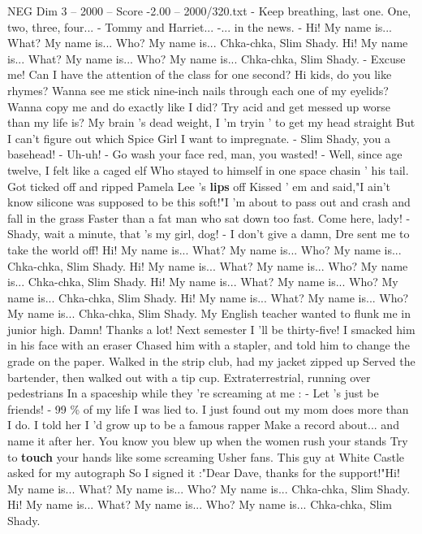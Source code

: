 \begin{textsample}{NEG Dim 3 – 2000 – Score -2.00 – 2000/320.txt}  \label{ex:f3_neg_007}
- Keep breathing, last one.
One, two, three, four... - Tommy and Harriet... -... in the news. - Hi!
My name is...
What?
My name is...
Who?
My name is...
Chka-chka, Slim Shady.
Hi!
My name is...
What?
My name is...
Who?
My name is...
Chka-chka, Slim Shady. - Excuse me!
Can I have the attention of the class for one second?
Hi kids, do you like rhymes?
Wanna see me stick nine-inch nails through each one of my eyelids?
Wanna copy me and do exactly like I did?
Try acid and get messed up worse than my life is?
My brain 's dead weight, I 'm tryin ' to get my head straight But I can't figure out which Spice Girl I want to impregnate. - Slim Shady, you a basehead! - Uh-uh! - Go wash your face red, man, you wasted! - Well, since age twelve, I felt like a caged elf Who stayed to himself in one space chasin ' his tail.
Got ticked off and ripped Pamela Lee 's \textbf{lips} off Kissed ' em and said,"I ain't know silicone was supposed to be this soft!"I 'm about to pass out and crash and fall in the grass Faster than a fat man who sat down too fast.
Come here, lady! - Shady, wait a minute, that 's my girl, dog! - I don't give a damn, Dre sent me to take the world off!
Hi!
My name is...
What?
My name is...
Who?
My name is...
Chka-chka, Slim Shady.
Hi!
My name is...
What?
My name is...
Who?
My name is...
Chka-chka, Slim Shady.
Hi!
My name is...
What?
My name is...
Who?
My name is...
Chka-chka, Slim Shady.
Hi!
My name is...
What?
My name is...
Who?
My name is...
Chka-chka, Slim Shady.
My English teacher wanted to flunk me in junior high.
Damn!
Thanks a lot!
Next semester I 'll be thirty-five!
I smacked him in his face with an eraser Chased him with a stapler, and told him to change the grade on the paper.
Walked in the strip club, had my jacket zipped up Served the bartender, then walked out with a tip cup.
Extraterrestrial, running over pedestrians In a spaceship while they 're screaming at me : - Let 's just be friends! - 99 \% of my life I was lied to.
I just found out my mom does more than I do.
I told her I 'd grow up to be a famous rapper Make a record about... and name it after her.
You know you blew up when the women rush your stands Try to \textbf{touch} your hands like some screaming Usher fans.
This guy at White Castle asked for my autograph So I signed it :"Dear Dave, thanks for the support!"Hi!
My name is...
What?
My name is...
Who?
My name is...
Chka-chka, Slim Shady.
Hi!
My name is...
What?
My name is...
Who?
My name is...
Chka-chka, Slim Shady.

\end{textsample}
